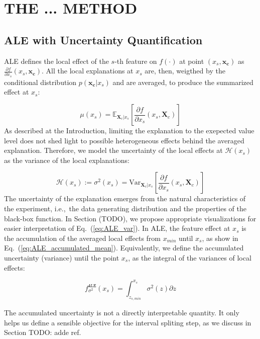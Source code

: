 \documentclass[twoside]{article}
\newcommand{\dfdx}{\frac{\partial f}{\partial x_s}}
\newcommand{\xc}{\mathbf{x_c}}
\newcommand{\Xcb}{\mathbf{X}_c}
\begin{document}
\section{THE ... METHOD}

\subsection{ALE with Uncertainty Quantification}

ALE defines the local effect of the \(s\)-th feature on \(f(\cdot)\)
at point \((x_s, \xc)\) as \(\dfdx (x_s, \xc)\). All the local
explanations at \(x_s\) are, then, weigthed by the conditional
distribution \(p(\xc|x_s)\) and are averaged, to produce the
summarized effect at \(x_s\):

\begin{equation}
  \label{eq:ALE_mean}
  \mu(x_s) = \mathbb{E}_{\Xcb|x_s}\left [\dfdx (x_s, \Xcb)\right ]
\end{equation}
\noindent
As described at the Introduction, limiting the explanation to the
exepected value level does not shed light to possible heterogeneous
effects behind the averaged explanation. Therefore, we model the
uncertainty of the local effects at \(\mathcal{H}(x_s)\) as the
variance of the local explanations:

\begin{equation}
  \label{eq:ALE_var}
  \mathcal{H}(x_s) := \sigma^2(x_s) = \mathrm{Var}_{\Xcb|x_s}\left [\dfdx (x_s, \Xcb) \right ]
\end{equation}
\noindent
The uncertainty of the explanation emerges from the natural
characteristics of the experiment, i.e.,~the data generating
distribution and the properties of the black-box function. In Section
(TODO), we propose appropriate visualizations for easier
interpretation of Eq.~(\ref{eq:ALE_var}). In ALE, the feature effect
at \(x_s\) is the accumulation of the averaged local effects from
\(x_{min}\) until \(x_s\), as show in
Eq.~(\ref{eq:ALE_accumulated_mean}). Equivalently, we define the
accumulated uncertainty (variance) until the point \(x_s\), as the
integral of the variances of local effects:

\begin{equation}
  \label{eq:ALE_accumulated_var}
  f^{\mathtt{ALE}}_{\sigma^2}(x_s) = \int_{z_{s, min}}^{x_s} \sigma^2(z) \partial z
\end{equation}
\noindent

The accumulated uncertainty is not a directly interpretable
quantity. It only helps us define a sensible objective for the
interval spliting step, as we discuss in Section TODO: adde ref.
\end{document}
